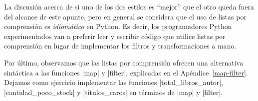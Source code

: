 \begin{subappendices}
La discusión acerca de si uno de los dos estilos es ``mejor'' que el otro queda
fuera del alcance de este apunte, pero en general se considera que el uso de
listas por comprensión es \emph{idiomático} en Python. Es decir, los
programadores Python experimentados van a preferir leer y escribir código que
utilice listas por comprensión en lugar de implementar los filtros y
transformaciones a mano.

Por último, observamos que las listas por comprensión ofrecen una alternativa
sintáctica a las funciones |map| y |filter|, explicadas en el
Apéndice~\ref{map-filter}. Dejamos como ejercicio implementar las funciones
|total_libros_autor|, |cantidad_poco_stock| y |titulos_caros| en términos de
|map| y |filter|.
\end{subappendices}
